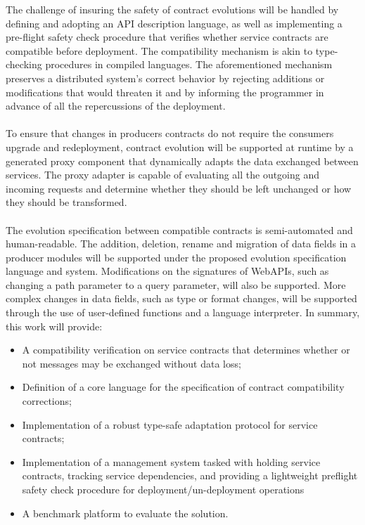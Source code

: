 The challenge of insuring the safety of contract evolutions will be handled by defining and adopting an API description language, as well as implementing
a pre-flight safety check procedure that verifies whether service contracts are compatible before deployment.
The compatibility mechanism is akin to type-checking procedures in compiled languages.
The aforementioned mechanism preserves a distributed system's correct behavior by rejecting additions or modifications that would threaten it and by informing the programmer in advance
of all the repercussions of the deployment.

\paragraph{}

To ensure that changes in producers contracts do not require the consumers upgrade and redeployment, contract evolution
will be supported at runtime by a generated proxy component that dynamically adapts the data exchanged between services.
The proxy adapter is capable of evaluating all the outgoing and incoming requests and determine whether
they should be left unchanged or how they should be transformed.

\paragraph{}

The evolution specification between compatible contracts is semi-automated and human-readable.
The addition, deletion, rename and migration of data fields in a producer modules will be supported under the proposed evolution specification language and system.
Modifications on the signatures of WebAPIs, such as changing a path parameter to a query parameter, will also be supported.
More complex changes in data fields, such as type or format changes,
will be supported through the use of user-defined functions and a language interpreter.
In summary, this work will provide:

\begin{itemize}
    \item A compatibility verification on service contracts that determines whether or not messages may be exchanged without data loss;
    \item Definition of a core language for the specification of contract compatibility corrections;
    \item Implementation of a robust type-safe adaptation protocol for service contracts;
    \item Implementation of a management system tasked with holding service contracts, tracking service dependencies,
    and providing a lightweight preflight safety check procedure for deployment/un-deployment operations
    \item A benchmark platform to evaluate the solution.
\end{itemize}

